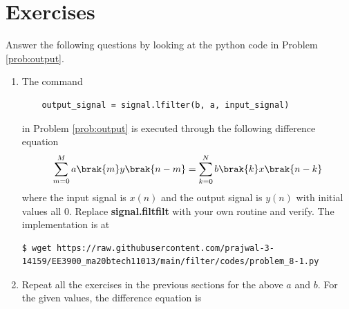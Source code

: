 \documentclass[journal,12pt,twocolumn]{IEEEtran}
\renewcommand\thesection{\arabic{section}}
\begin{document}
\section{Exercises}
\noindent Answer the following questions by looking at the python code in Problem \ref{prob:output}.
\begin{enumerate}[label=\thesection.\arabic*]
	\item
	The command
	\begin{lstlisting}
	output_signal = signal.lfilter(b, a, input_signal)
	\end{lstlisting}
	in Problem \ref{prob:output} is executed through the following difference equation
	\begin{equation}
		\label{eq:iir_filter_gen}
		\sum _{m=0}^{M}a\brak{m}y\brak{n-m}=\sum _{k=0}^{N}b\brak{k}x\brak{n-k}
	\end{equation}
	where the input signal is $x(n)$ and the output signal is $y(n)$ with initial values all 0. Replace
	\textbf{signal.filtfilt} with your own routine and verify.
	\solution
	The implementation is at
\begin{lstlisting}
$ wget https://raw.githubusercontent.com/prajwal-3-14159/EE3900_ma20btech11013/main/filter/codes/problem_8-1.py
\end{lstlisting}
	\item Repeat all the exercises in the previous sections for the above $a$ and $b$.
	\solution
	For the given values, the difference equation is

\end{enumerate}
\end{document}
